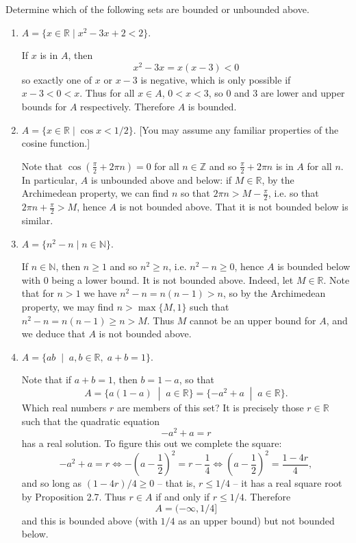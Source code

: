\documentclass[11pt,dvipsnames]{book}
\def\R{\mathbb{R}}
\numberwithin{equation}{section} %
\numberwithin{figure}{section} %
\numberwithin{table}{section} %
\begin{document}
\begin{exercise}
Determine which of the following sets are bounded or unbounded above. 
\begin{enumerate}[label=(\alph*)]
\item $A=\{x \in \R\; | \; x^2-3x+2<2\}$. 
\begin{solution}
If $x$ is in $A$, then
\[
x^2-3x=x(x-3)<0
\]
so exactly one of $x$ or $x-3$ is negative, which is only possible if $x-3< 0< x$. Thus for all $x \in A$, $0<x<3$, so $0$ and $3$ are lower and upper bounds for $A$ respectively. Therefore $A$ is bounded.
\end{solution}
\item $A= \{x \in \R \; | \; \cos x<1/2\}$. [You may assume any familiar properties of the cosine function.]
\begin{solution}
Note that $\cos \left(\frac{\pi}{2}+2\pi n\right)=0$ for all $n\in\mathbb{Z}$ and so $\frac{\pi}{2}+2\pi n$ is in $A$ for all $n$. In particular, $A$ is unbounded above and below: if $M\in\mathbb{R}$, by the Archimedean property, we can find $n$  so that $2\pi n>M-\frac{\pi}{2}$, i.e. so that $2\pi n+\frac{\pi}{2}>M$, hence $A$ is not bounded above. That it is not bounded below is similar. 
\end{solution}
\item $A = \{n^2-n \; | \; n\in\mathbb{N}\}$. 
\begin{solution}
If $n\in\mathbb{N}$, then $n\geq 1$ and so $n^2\geq n$, i.e. $n^2-n \geq 0$, hence $A$ is bounded below with $0$ being a lower bound. It is not bounded above. Indeed, let $M \in \R$. Note that for $n > 1$ we have $n^2-n=n(n-1)> n$, so by the Archimedean property, we may find $n>\max\{M,1\}$ such that $n^2-n=n(n-1)\geq n>M$. Thus $M$ cannot be an upper bound for $A$, and we deduce that $A$ is not bounded above.
\end{solution}
\item $A=\{ab \;\;| \;\;  a, b \in \R, \; a+b=1\}$.
\begin{solution}
Note that if $a+b=1$, then $b=1-a$, so that
\[
A = \{a(1-a)\;\; |\;\;a\in\mathbb{R}\} = \{- a^2 +a \;\; |\;\;a\in\mathbb{R}\}.
\]
Which real numbers $r$ are members of this set? It is precisely those $r \in \R$ such that the quadratic equation
\[ 
-a^2 + a =r
\]
has a real solution. To figure this out we complete the square:
\[ 
-a^2 + a =r \iff -\left(a-\frac{1}{2}\right)^2 = r -\frac{1}{4} \iff \left(a-\frac{1}{2}\right)^2 =\frac{1-4r}{4},
\]
and so long as $(1-4r)/4 \geq 0$ -- that is, $r \leq 1/4$ --  it has a real square root by Proposition 2.7. Thus $r \in A$ if and only if $r \leq 1/4$. Therefore 
\[
A = (- \infty, 1/4]
\]
and this is bounded above (with $1/4$ as an upper bound) but not bounded below.

\end{solution}
\end{enumerate}

\end{exercise}
\end{document}
